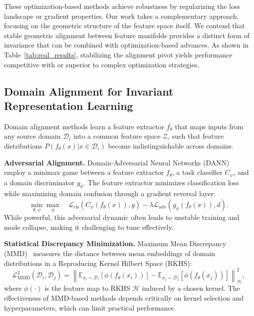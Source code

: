 \documentclass[preprint,12pt]{elsarticle}
\begin{document}
These optimization-based methods achieve robustness by regularizing the loss landscape or gradient properties. Our work takes a complementary approach, focusing on the geometric structure of the feature space itself. We contend that stable geometric alignment between feature manifolds provides a distinct form of invariance that can be combined with optimization-based advances. As shown in Table~\ref{tab:real_results}, stabilizing the alignment pivot yields performance competitive with or superior to complex optimization strategies.

\subsection{Domain Alignment for Invariant Representation Learning}

Domain alignment methods learn a feature extractor $f_\theta$ that maps inputs from any source domain $\mathcal{D}_i$ into a common feature space $\mathcal{Z}$, such that feature distributions $P(f_\theta(x) | x \in \mathcal{D}_i)$ become indistinguishable across domains.

\begin{sloppypar} 
\textbf{Adversarial Alignment.} Domain-Adversarial Neural Networks (DANN)~\citep{ganin2016domain} employ a minimax game between a feature extractor $f_\theta$, a task classifier $C_\psi$, and a domain discriminator $g_\phi$. The feature extractor minimizes classification loss while maximizing domain confusion through a gradient reversal layer:
\begin{equation}
    \min_{\theta, \psi} \max_{\phi} \quad \mathcal{L}_{\text{cls}}(C_\psi(f_\theta(x)), y) - \lambda \mathcal{L}_{\text{adv}}(g_\phi(f_\theta(x)), d).
\end{equation}
While powerful, this adversarial dynamic often leads to unstable training and mode collapse, making it challenging to tune effectively.
\end{sloppypar} 

\textbf{Statistical Discrepancy Minimization.} Maximum Mean Discrepancy (MMD)~\citep{gretton2012kernel, li2018domain_mmd} measures the distance between mean embeddings of domain distributions in a Reproducing Kernel Hilbert Space (RKHS):
\begin{equation}
    \mathcal{L}_{\text{MMD}}^2(\mathcal{D}_i, \mathcal{D}_j) = \left\| \mathbb{E}_{x_i \sim \mathcal{D}_i}[\phi(f_\theta(x_i))] - \mathbb{E}_{x_j \sim \mathcal{D}_j}[\phi(f_\theta(x_j))] \right\|_{\mathcal{H}}^2,
\end{equation}
where $\phi(\cdot)$ is the feature map to RKHS $\mathcal{H}$ induced by a chosen kernel. The effectiveness of MMD-based methods depends critically on kernel selection and hyperparameters, which can limit practical performance.
\end{document}
